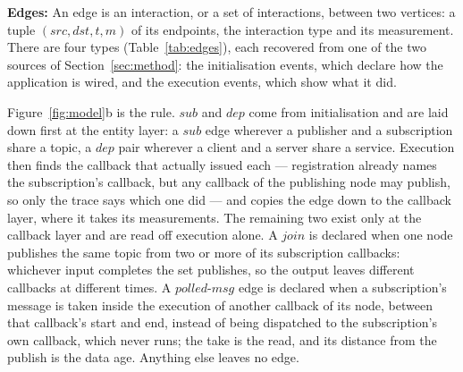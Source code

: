 \noindent
\textbf{Edges:}
An edge is an interaction, or a set of interactions, between two vertices: a
tuple $(\mathit{src},\mathit{dst},t,m)$ of its endpoints, the interaction type
and its measurement. There are four types (Table~\ref{tab:edges}), each
recovered from one of the two sources of Section~\ref{sec:method}: the
initialisation events, which declare how the application is wired, and the
execution events, which show what it did.

\begin{table}[t]
\centering
\caption{The four kinds of interaction an edge can stand for.}
\label{tab:edges}
\end{table}

\noindent
Figure~\ref{fig:model}b is the rule. $\mathit{sub}$ and $\mathit{dep}$ come
from initialisation and are laid down first at the entity layer: a
$\mathit{sub}$ edge wherever a publisher and a subscription share a topic, a
$\mathit{dep}$ pair wherever a client and a server share a service. Execution
then finds the callback that actually issued each --- registration already
names the subscription's callback, but any callback of the publishing node may
publish, so only the trace says which one did --- and copies the edge down to
the callback layer, where it takes its measurements. The remaining two exist
only at the callback layer and are read off execution alone. A $\mathit{join}$
is declared when one node publishes the same topic from two or more of its
subscription callbacks: whichever input completes the set publishes, so the
output leaves different callbacks at different times. A
$\mathit{polled\text{-}msg}$ edge is declared when a subscription's message is
taken inside the execution of another callback of its node, between that
callback's start and end, instead of being dispatched to the subscription's own
callback, which never runs; the take is the read, and its distance from the
publish is the data age. Anything else leaves no edge.

